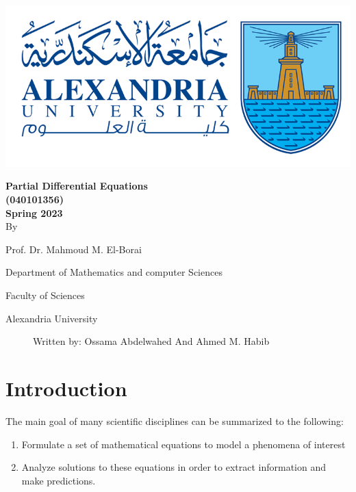 \documentclass[]{article}
\begin{document}
\newpage
\setcounter{page}{1}
\begingroup
{}
\begin{center}
    \includegraphics[scale=.5]{collage logo.png}
    \vspace*{1.5cm}
    \par
    {\fontsize{20pt}{30pt}\selectfont
    \textbf{Partial Differential Equations\\(040101356)\\Spring 2023}
    \\
    \vspace*{.75cm}
    By
    \vspace*{.75cm}
    
    Prof. Dr. Mahmoud M. El-Borai
    
    Department of Mathematics and computer Sciences
    
    Faculty of Sciences
    
    Alexandria University
    }

    \begin{figure}[b]
        \centering
        Written by: Ossama Abdelwahed And Ahmed M. Habib    
    \end{figure}
\end{center}

\restoregeometry
\endgroup
\newpage

\tableofcontents

\newpage


\section{Introduction}
The main goal of many scientific disciplines can be summarized to the following:

\begin{enumerate}
\item Formulate a set of mathematical equations to model a phenomena of interest
\item Analyze solutions to these equations in order to extract information and make predictions.
\end{enumerate}
\end{document}
